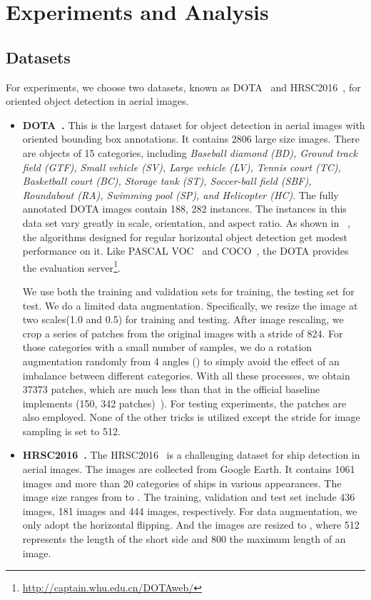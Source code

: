 \documentclass[11pt,onecolumn]{article}         \usepackage[top=3.6cm, bottom=3.2cm, left=2.3cm, right=2.3cm]{geometry}
\begin{document}
\section{Experiments and Analysis}
\subsection{Datasets}
For experiments, we choose two datasets, known as DOTA~\cite{DOTA} and HRSC2016~\cite{HRSC2016}, for oriented object detection in aerial images.

\begin{itemize}
    \item \label{shortname} \textbf{DOTA~\cite{DOTA}.} This is the largest dataset for object detection in aerial images with oriented bounding box annotations. It contains 2806 large size images. There are objects of 15 categories, including {\em Baseball diamond (BD), Ground track field (GTF), Small vehicle (SV),  Large vehicle (LV), Tennis court (TC), Basketball court (BC), Storage tank (ST), Soccer-ball field (SBF), Roundabout (RA), Swimming pool (SP), and  Helicopter (HC)}. The fully annotated DOTA images contain 188, 282 instances. The instances in this data set vary greatly in scale, orientation, and aspect ratio. As shown in ~\cite{DOTA}, the algorithms designed for regular horizontal object detection get modest performance on it.
    Like PASCAL VOC~\cite{PASCALVOC} and COCO~\cite{COCO}, the DOTA provides the evaluation server\footnote{\url{http://captain.whu.edu.cn/DOTAweb/}}. 
    
    We use both the training and validation sets for training, the testing set for test. We do a limited data augmentation. Specifically, we resize the image at two scales(1.0 and 0.5) for training and testing. After image rescaling, we crop a series of  patches from the original images with a stride of 824. For those categories with a small number of samples, we do a rotation augmentation randomly from 4 angles () to simply avoid the effect of an imbalance between different categories. With all these processes, we obtain 37373 patches, which are much less than that in the official baseline implements (150, 342 patches)~\cite{DOTA}). 
For testing experiments, the  patches are also employed. None of the other tricks is utilized except the stride for image sampling is set to 512. 
    \item \textbf{HRSC2016~\cite{HRSC2016}.} The HRSC2016~\cite{HRSC2016} is a challenging dataset for ship detection in aerial images. The images are collected from Google Earth. It contains 1061 images and more than 20 categories of ships in various appearances. The image size ranges from  to . The training, validation and test set include 436 images, 181 images and 444 images, respectively. For data augmentation, we only adopt the horizontal flipping. And the images are resized to , where 512 represents the length of the short side and 800 the maximum length of an image.
\end{itemize}
\end{document}
